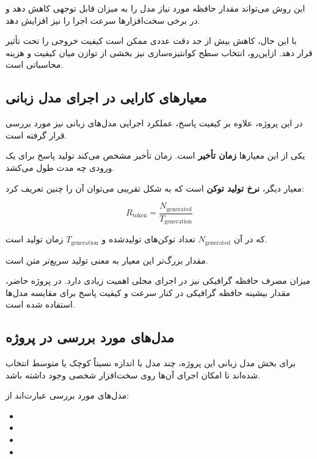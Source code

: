 این روش می‌تواند مقدار حافظه مورد نیاز مدل را به میزان قابل
توجهی کاهش دهد و در برخی سخت‌افزارها سرعت اجرا را نیز افزایش
دهد.

با این حال، کاهش بیش از حد دقت عددی ممکن است کیفیت خروجی را
تحت تأثیر قرار دهد.
ازاین‌رو، انتخاب سطح کوانتیزه‌سازی نیز بخشی از توازن میان
کیفیت و هزینه محاسباتی است.


\subsection{معیارهای کارایی در اجرای مدل زبانی}

در این پروژه، علاوه بر کیفیت پاسخ، عملکرد اجرایی مدل‌های زبانی
نیز مورد بررسی قرار گرفته است.

یکی از این معیارها
\textbf{زمان تأخیر}
است.
زمان تأخیر مشخص می‌کند تولید پاسخ برای یک ورودی چه مدت طول
می‌کشد.

معیار دیگر،
\textbf{نرخ تولید توکن}
است که به شکل تقریبی می‌توان آن را چنین تعریف کرد:

\begin{equation}
R_{\mathrm{token}}
=
\frac{N_{\mathrm{generated}}}
     {T_{\mathrm{generation}}}
\end{equation}

که در آن $N_{\mathrm{generated}}$ تعداد توکن‌های تولیدشده و
$T_{\mathrm{generation}}$ زمان تولید است.

مقدار بزرگ‌تر این معیار به معنی تولید سریع‌تر متن است.

میزان مصرف حافظه گرافیکی نیز در اجرای محلی اهمیت زیادی دارد.
در پروژه حاضر، مقدار بیشینه حافظه گرافیکی
در کنار سرعت و کیفیت پاسخ برای مقایسه مدل‌ها استفاده شده است.


\subsection{مدل‌های مورد بررسی در پروژه}

برای بخش مدل زبانی این پروژه، چند مدل با اندازه نسبتاً کوچک
یا متوسط انتخاب شده‌اند تا امکان اجرای آن‌ها روی سخت‌افزار شخصی
وجود داشته باشد.

مدل‌های مورد بررسی عبارت‌اند از:

\begin{itemize}

    \item

    \item

    \item

    \item

\end{itemize}

